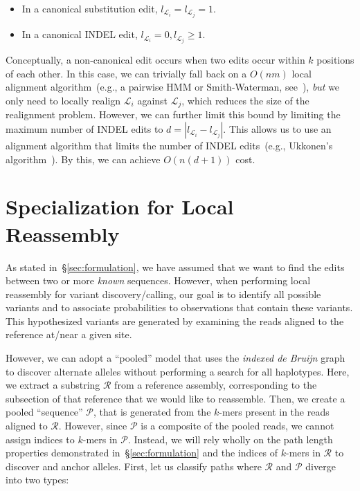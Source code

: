\documentclass[11pt]{article}
\begin{document}
\begin{itemize}
\item In a canonical substitution edit, $l_{\mathcal{L}_i} = l_{\mathcal{L}_j} = 1$.
\item In a canonical INDEL edit, $l_{\mathcal{L}_i} = 0, l_{\mathcal{L}_j} \ge 1$.
\end{itemize}

Conceptually, a non-canonical edit occurs when two edits occur within $k$ positions of each other. In
this case, we can trivially fall back on a $O(nm)$ local alignment algorithm~(e.g., a pairwise HMM or
Smith-Waterman, see~\cite{durbin98,smith81}), \emph{but} we only need to locally realign
$\mathcal{L}_i$ against $\mathcal{L}_j$, which reduces the size of the realignment problem. However, we
can further limit this bound by limiting the maximum number of INDEL edits to $d = | l_{\mathcal{L}_i} -
l_{\mathcal{L}_j} |$. This allows us to use an alignment algorithm that limits the number of INDEL
edits~(e.g., Ukkonen's algorithm~\cite{ukkonen85}). By this, we can achieve $O(n(d + 1))$ cost.

\section{Specialization for Local Reassembly}
\label{sec:local-reassembly}

As stated in~\S\ref{sec:formulation}, we have assumed that we want to find the edits between two or
more \emph{known} sequences. However, when performing local reassembly for variant discovery/calling,
our goal is to identify all possible variants and to associate probabilities to observations that contain these
variants. This hypothesized variants are generated by examining the reads aligned to the reference
at/near a given site.

However, we can adopt a ``pooled'' model that uses the \emph{indexed de Bruijn} graph to discover alternate
alleles without performing a search for all haplotypes. Here, we extract a substring $\mathcal{R}$ from a
reference assembly, corresponding to the subsection of that reference that we would like to reassemble.
Then, we create a pooled ``sequence'' $\mathcal{P}$, that is generated from the $k$-mers present in
the reads aligned to $\mathcal{R}$. However, since $\mathcal{P}$ is a composite of the pooled reads, we
cannot assign indices to $k$-mers in $\mathcal{P}$. Instead, we will rely wholly on the path length
properties demonstrated in~\S\ref{sec:formulation} and the indices of $k$-mers in $\mathcal{R}$ to
discover and anchor alleles. First, let us classify paths where $\mathcal{R}$ and $\mathcal{P}$ diverge
into two types:
\end{document}
